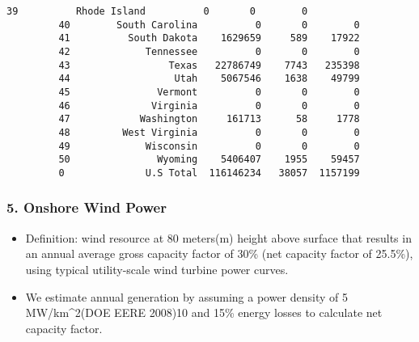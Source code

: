 \documentclass[11pt]{article}
\providecommand{\tightlist}{%
      \setlength{\itemsep}{0pt}\setlength{\parskip}{0pt}}
\begin{document}
\begin{Verbatim}[commandchars=\\\{\}]
         39          Rhode Island          0       0        0
         40        South Carolina          0       0        0
         41          South Dakota    1629659     589    17922
         42             Tennessee          0       0        0
         43                 Texas   22786749    7743   235398
         44                  Utah    5067546    1638    49799
         45               Vermont          0       0        0
         46              Virginia          0       0        0
         47            Washington     161713      58     1778
         48         West Virginia          0       0        0
         49             Wisconsin          0       0        0
         50               Wyoming    5406407    1955    59457
         0              U.S Total  116146234   38057  1157199
\end{Verbatim}
            
    \subsubsection{5. Onshore Wind Power}\label{onshore-wind-power}

\begin{itemize}
\tightlist
\item
  Definition: wind resource at 80 meters(m) height above surface that
  results in an annual average gross capacity factor of 30\% (net
  capacity factor of 25.5\%), using typical utility-scale wind turbine
  power curves.
\item
  We estimate annual generation by assuming a power density of 5
  MW/km\^{}2(DOE EERE 2008)10 and 15\% energy losses to calculate net
  capacity factor.
\end{itemize}
\end{document}
